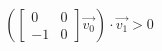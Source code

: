 \documentclass[12pt]{article}
\begin{document}
    \[
    \left(
        \left[ \begin{array}{rr} 0 & 0\\ -1 & 0 \end{array} \right]
        \overrightarrow{v_0}
    \right)
    \cdot \overrightarrow{v_1} > 0
    \]
\end{document}
